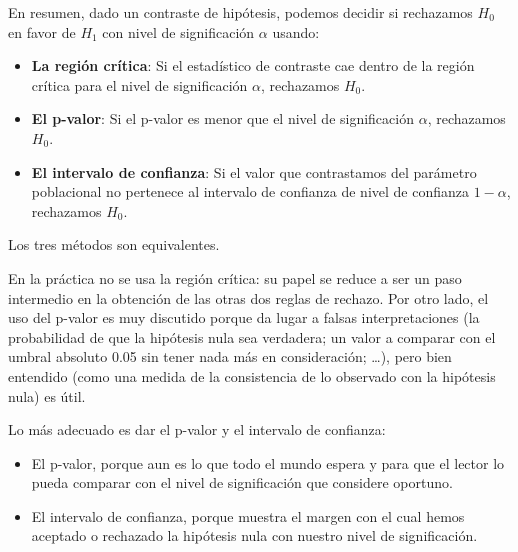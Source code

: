 \documentclass[
  spanish,
  letterpaper,
  DIV=11,
  numbers=noendperiod]{scrreprt}
\providecommand{\tightlist}{%
  \setlength{\itemsep}{0pt}\setlength{\parskip}{0pt}}
\begin{document}
\begin{tcolorbox}[enhanced jigsaw, arc=.35mm, bottomrule=.15mm, bottomtitle=1mm, breakable, colback=white, colbacktitle=quarto-callout-important-color!10!white, colframe=quarto-callout-important-color-frame, coltitle=black, left=2mm, leftrule=.75mm, opacityback=0, opacitybacktitle=0.6, rightrule=.15mm, title=\textcolor{quarto-callout-important-color}{\faExclamation}\hspace{0.5em}{Importante}, titlerule=0mm, toprule=.15mm, toptitle=1mm]

En resumen, dado un contraste de hipótesis, podemos decidir si
rechazamos \(H_0\) en favor de \(H_1\) con nivel de significación
\(\alpha\) usando:

\begin{itemize}
\item
  \textbf{La región crítica}: Si el estadístico de contraste cae dentro
  de la región crítica para el nivel de significación \(\alpha\),
  rechazamos \(H_0\).
\item
  \textbf{El p-valor}: Si el p-valor es menor que el nivel de
  significación \(\alpha\), rechazamos \(H_0\).
\item
  \textbf{El intervalo de confianza}: Si el valor que contrastamos del
  parámetro poblacional no pertenece al intervalo de confianza de nivel
  de confianza \(1-\alpha\), rechazamos \(H_0\).
\end{itemize}

Los tres métodos son equivalentes.

\end{tcolorbox}

En la práctica no se usa la región crítica: su papel se reduce a ser un
paso intermedio en la obtención de las otras dos reglas de rechazo. Por
otro lado, el uso del p-valor es muy discutido porque da lugar a falsas
interpretaciones (la probabilidad de que la hipótesis nula sea
verdadera; un valor a comparar con el umbral absoluto 0.05 sin tener
nada más en consideración; \ldots), pero bien entendido (como una medida
de la consistencia de lo observado con la hipótesis nula) es útil.

Lo más adecuado es dar el p-valor y el intervalo de confianza:

\begin{itemize}
\tightlist
\item
  El p-valor, porque aun es lo que todo el mundo espera y para que el
  lector lo pueda comparar con el nivel de significación que considere
  oportuno.
\item
  El intervalo de confianza, porque muestra el margen con el cual hemos
  aceptado o rechazado la hipótesis nula con nuestro nivel de
  significación.
\end{itemize}
\end{document}
